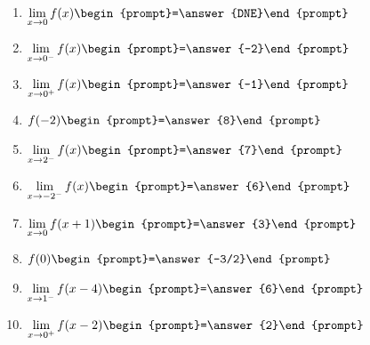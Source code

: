 \documentclass{ximera}
\begin{document}
\begin{question}
\begin{enumerate}
\item $\displaystyle\lim_{x\to 0} f(x) \begin{prompt}=\answer{DNE}\end{prompt}$ 
\item $\displaystyle\lim_{x\to 0^-} f(x) \begin{prompt}=\answer{-2}\end{prompt}$  
\item $\displaystyle\lim_{x\to 0^+} f(x) \begin{prompt}=\answer{-1}\end{prompt}$  
\item $f(-2) \begin{prompt}=\answer{8}\end{prompt}$  
\item $\displaystyle\lim_{x\to 2^-} f(x) \begin{prompt}=\answer{7}\end{prompt}$  
\item $\displaystyle\lim_{x\to -2^-} f(x) \begin{prompt}=\answer{6}\end{prompt}$  
\item $\displaystyle\lim_{x\to 0} f(x+1) \begin{prompt}=\answer{3}\end{prompt}$  
\item $f(0) \begin{prompt}=\answer{-3/2}\end{prompt}$ 
\item $\displaystyle\lim_{x\to 1^-} f(x-4) \begin{prompt}=\answer{6}\end{prompt}$  
\item $\displaystyle\lim_{x\to 0^+} f(x-2) \begin{prompt}=\answer{2}\end{prompt}$
\end{enumerate}
\end{question}
\end{document}
